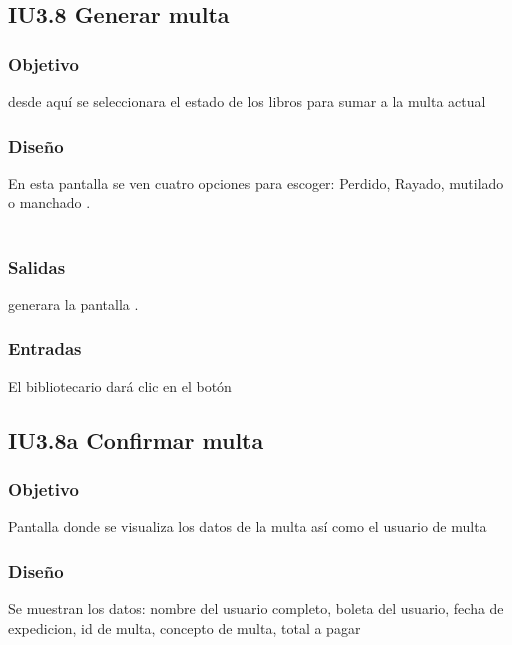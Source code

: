 \newpage
\subsection{IU3.8 Generar multa}

\subsubsection{Objetivo}
	desde aquí se seleccionara el estado de los libros para sumar a la multa actual

\subsubsection{Diseño}
	En esta pantalla se ven cuatro opciones para escoger: Perdido, Rayado, mutilado o manchado  .  \\\\


\subsubsection{Salidas}
	\begin{Citemize}
		\item generara la pantalla . 
	\end{Citemize}
	
\subsubsection{Entradas}
	\begin{Citemize}
		\item El bibliotecario dará clic en el botón \IUbutton{Confirmar}
	\end{Citemize}




\subsection{IU3.8a Confirmar multa}

\subsubsection{Objetivo}
	Pantalla donde se visualiza los datos de la multa así como el usuario de multa

\subsubsection{Diseño}
	Se muestran los datos: nombre del usuario completo, boleta del usuario, fecha de expedicion, id de multa, concepto de multa, total a pagar  \\\\


